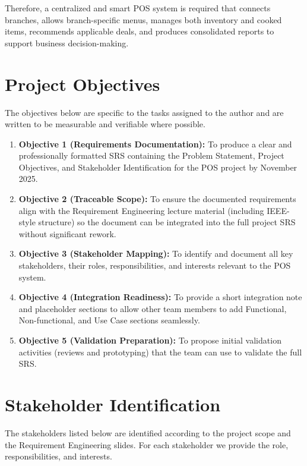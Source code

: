 \documentclass[12pt,a4paper]{article}
\begin{document}
Therefore, a centralized and smart POS system is required that connects branches, allows branch-specific menus, manages both inventory and cooked items, recommends applicable deals, and produces consolidated reports to support business decision-making.

\section{Project Objectives}
The objectives below are specific to the tasks assigned to the author and are written to be measurable and verifiable where possible.

\begin{enumerate}
    \item \textbf{Objective 1 (Requirements Documentation):} To produce a clear and professionally formatted SRS containing the Problem Statement, Project Objectives, and Stakeholder Identification for the POS project by November 2025.
    \item \textbf{Objective 2 (Traceable Scope):} To ensure the documented requirements align with the Requirement Engineering lecture material (including IEEE-style structure) so the document can be integrated into the full project SRS without significant rework.
    \item \textbf{Objective 3 (Stakeholder Mapping):} To identify and document all key stakeholders, their roles, responsibilities, and interests relevant to the POS system.
    \item \textbf{Objective 4 (Integration Readiness):} To provide a short integration note and placeholder sections to allow other team members to add Functional, Non-functional, and Use Case sections seamlessly.
    \item \textbf{Objective 5 (Validation Preparation):} To propose initial validation activities (reviews and prototyping) that the team can use to validate the full SRS.
\end{enumerate}

\section{Stakeholder Identification}
The stakeholders listed below are identified according to the project scope and the Requirement Engineering slides. For each stakeholder we provide the role, responsibilities, and interests.
\end{document}

